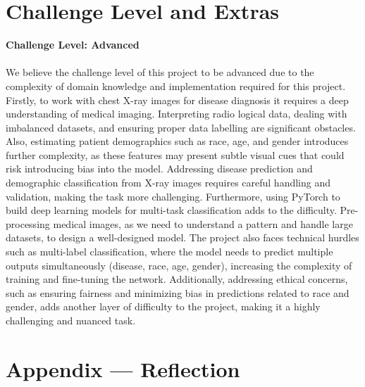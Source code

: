 \documentclass{article}
\begin{document}
\section{Challenge Level and Extras}

\textbf{Challenge Level: Advanced} \\ \\ 
We believe the challenge level of this project to be advanced due to the complexity of domain knowledge and implementation required for this project. Firstly, to work with chest X-ray images for disease diagnosis it requires a deep understanding of medical imaging. Interpreting radio logical data, dealing with imbalanced datasets, and ensuring proper data labelling are significant obstacles. Also, estimating patient demographics such as race, age, and gender introduces further complexity, as these features may present subtle visual cues that could risk introducing bias into the model. Addressing disease prediction and demographic classification from X-ray images requires careful handling and validation, making the task more challenging.
Furthermore, using PyTorch to build deep learning models for multi-task classification adds to the difficulty. Pre-processing medical images, as we need to understand a pattern and handle large datasets, to design a well-designed model. The project also faces technical hurdles such as multi-label classification, where the model needs to predict multiple outputs simultaneously (disease, race, age, gender), increasing the complexity of training and fine-tuning the network. Additionally, addressing ethical concerns, such as ensuring fairness and minimizing bias in predictions related to race and gender, adds another layer of difficulty to the project, making it a highly challenging and nuanced task.

\section*{Appendix --- Reflection}
\end{document}
